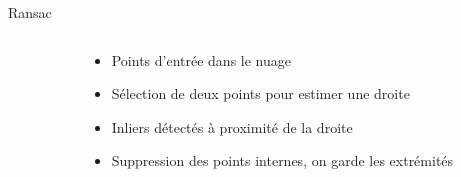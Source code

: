 \begin{frame}[noframenumbering]{Ransac}
\begin{columns}
\begin{column}{0.5\textwidth}
\begin{tikzpicture}[scale=1]
            \end{tikzpicture}
        \end{column}

        \begin{column}{0.5\textwidth}
            \small
            \begin{itemize}
                \item<1-> Points d’entrée dans le nuage
                \item<2-> Sélection de deux points pour estimer une droite
                \item<3-> Inliers détectés à proximité de la droite
                \item<4-> Suppression des points internes, on garde les extrémités
            \end{itemize}

            \vspace{0.5em}
        \end{column}
    \end{columns}
\end{frame}


